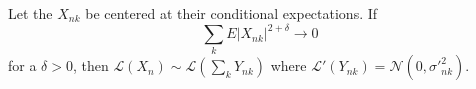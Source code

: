 Let the $X_{nk}$ be centered at their conditional expectations. If $$\sum_k E |X_{nk}|^{2+\delta} \to 0$$ for a $\delta > 0$, then $\mathcal{L}(X_n) \sim \mathcal{L}(\sum_k Y_{nk})$ where $\mathcal{L}'(Y_{nk}) = \mathcal{N}(0, \sigma'^2_{nk})$.
